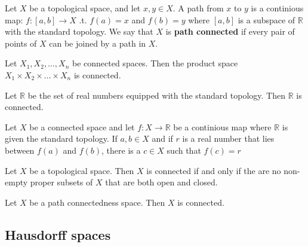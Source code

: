 \documentclass{article}
\theoremstyle{remark}
\begin{document}
\begin{definition}
    Let $X$ be a topological space, and let $x,y \in X$. A path from $x$ to  $y$ is a continious map:  $f: \left[ a,b
    \right]  \to X$ .t. $f\left( a \right) = x$ and $f\left( b \right) = y$ where $\left[ a,b \right]$ is a subspace of
    $ \mathbb{R} $ with the standard topology. We say that $X$ is \textbf{path connected} if every pair of points of $X
    $ can be joined by a path in $X$.

\end{definition}


\begin{theorem}
    Let $X_{1},  X_{2}, \ldots, X_{n}$ be connected spaces. Then the product space $X_{1} \times X_{2} \times  \ldots
    \times  X_{n}$ is connected.

\end{theorem}

\begin{theorem}
    Let $\mathbb{R} $ be the set of real numbers equipped with the standard topology. Then $\mathbb{R} $ is connected.

\end{theorem}

\begin{theorem}

    Let $X$ be a connected space and let $f: X \to  \mathbb{R} $ be a continious map where $ \mathbb{R} $ is given the
    standard topology.  If $a,b \in X $ and if $r$ is a real number that lies between $f\left(a  \right) $ and $f\left(
    b\right)$, there is a $c \in  X$ such that $f\left( c \right) = r$

\end{theorem}

\begin{theorem}[Connectivity]
    Let $X$ be a topological space. Then $X$ is connected if and only if the are no non-empty proper subsets of $X$ that
    are both open and closed.
\end{theorem}

\begin{theorem}
    Let $X$ be a path connectedness space. Then $X$ is connected.

\end{theorem}
\subsection{Hausdorff spaces}%
\label{sub:hausdorff_spaces}
\end{document}
